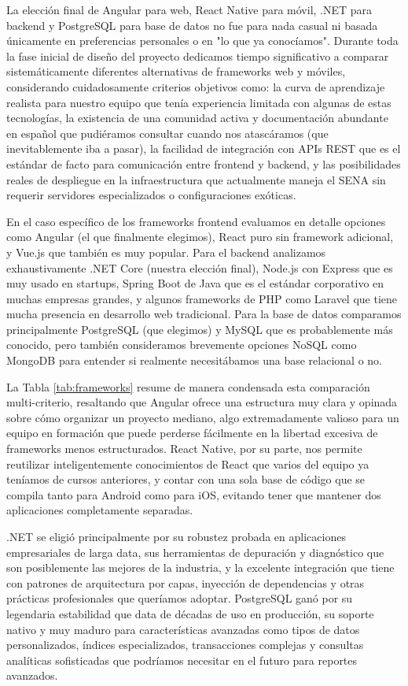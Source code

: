 La elección final de Angular para web, React Native para móvil, .NET para backend y PostgreSQL para base de datos no fue para nada casual ni basada únicamente en preferencias personales o en "lo que ya conocíamos". Durante toda la fase inicial de diseño del proyecto dedicamos tiempo significativo a comparar sistemáticamente diferentes alternativas de frameworks web y móviles, considerando cuidadosamente criterios objetivos como: la curva de aprendizaje realista para nuestro equipo que tenía experiencia limitada con algunas de estas tecnologías, la existencia de una comunidad activa y documentación abundante en español que pudiéramos consultar cuando nos atascáramos (que inevitablemente iba a pasar), la facilidad de integración con APIs REST que es el estándar de facto para comunicación entre frontend y backend, y las posibilidades reales de despliegue en la infraestructura que actualmente maneja el SENA sin requerir servidores especializados o configuraciones exóticas.

En el caso específico de los frameworks frontend evaluamos en detalle opciones como Angular (el que finalmente elegimos), React puro sin framework adicional, y Vue.js que también es muy popular. Para el backend analizamos exhaustivamente .NET Core (nuestra elección final), Node.js con Express que es muy usado en startups, Spring Boot de Java que es el estándar corporativo en muchas empresas grandes, y algunos frameworks de PHP como Laravel que tiene mucha presencia en desarrollo web tradicional. Para la base de datos comparamos principalmente PostgreSQL (que elegimos) y MySQL que es probablemente más conocido, pero también consideramos brevemente opciones NoSQL como MongoDB para entender si realmente necesitábamos una base relacional o no.

La Tabla \ref{tab:frameworks} resume de manera condensada esta comparación multi-criterio, resaltando que Angular ofrece una estructura muy clara y opinada sobre cómo organizar un proyecto mediano, algo extremadamente valioso para un equipo en formación que puede perderse fácilmente en la libertad excesiva de frameworks menos estructurados. React Native, por su parte, nos permite reutilizar inteligentemente conocimientos de React que varios del equipo ya teníamos de cursos anteriores, y contar con una sola base de código que se compila tanto para Android como para iOS, evitando tener que mantener dos aplicaciones completamente separadas.

.NET se eligió principalmente por su robustez probada en aplicaciones empresariales de larga data, sus herramientas de depuración y diagnóstico que son posiblemente las mejores de la industria, y la excelente integración que tiene con patrones de arquitectura por capas, inyección de dependencias y otras prácticas profesionales que queríamos adoptar. PostgreSQL ganó por su legendaria estabilidad que data de décadas de uso en producción, su soporte nativo y muy maduro para características avanzadas como tipos de datos personalizados, índices especializados, transacciones complejas y consultas analíticas sofisticadas que podríamos necesitar en el futuro para reportes avanzados.

